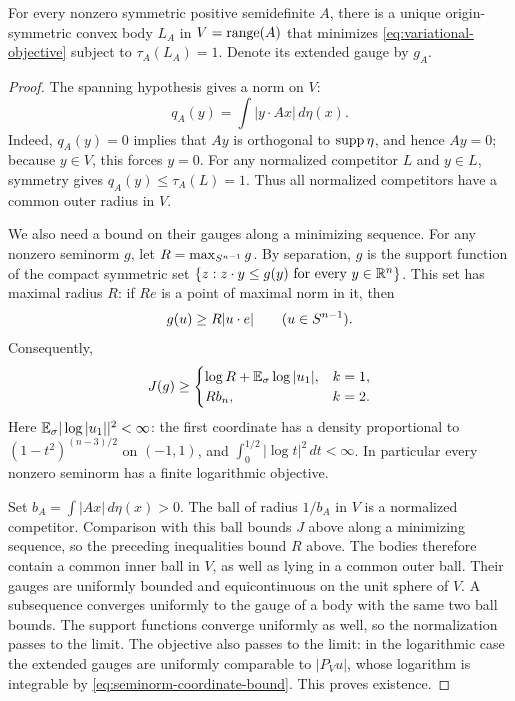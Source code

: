 \begin{lemma}\label{lem:minimizer}
For every nonzero symmetric positive semidefinite $A$, there is a unique
origin-symmetric convex body $L_A$ in $V=\operatorname{range}(A)$ that minimizes
\eqref{eq:variational-objective} subject to $\tau_A(L_A)=1$.
Denote its extended gauge by $g_A$.
\end{lemma}

\begin{proof}
The spanning hypothesis gives a norm on $V$:
\[
 q_A(y)=\int |y\cdot Ax|\,d\eta(x).
\]
Indeed, $q_A(y)=0$ implies that $Ay$ is orthogonal to $\operatorname{supp}\eta$,
and hence $Ay=0$; because $y\in V$, this forces $y=0$.
For any normalized competitor $L$ and $y\in L$, symmetry gives
$q_A(y)\le\tau_A(L)=1$. Thus all normalized competitors have a common
outer radius in $V$.

We also need a bound on their gauges along a minimizing sequence.
For any nonzero seminorm $g$, let $R=\max_{S^{n-1}}g$. By separation,
$g$ is the support function of the compact symmetric set
$\{z:z\cdot y\le g(y)\text{ for every }y\in\mathbb R^n\}$.
This set has maximal radius $R$: if $Re$ is a point of maximal norm
in it, then
\begin{equation}\label{eq:seminorm-coordinate-bound}
 g(u)\ge R|u\cdot e|\qquad(u\in S^{n-1}).
\end{equation}
Consequently,
\[
 J(g)\ge
 \begin{cases}
  \log R+\mathbb E_{\sigma}\log|u_1|,&k=1,\\
  Rb_n,&k=2.
 \end{cases}
\]
Here $\mathbb E_{\sigma}|\log|u_1||^2<\infty$: the first coordinate has a density
proportional to $(1-t^2)^{(n-3)/2}$ on $(-1,1)$, and
$\int_0^{1/2}|\log t|^2\,dt<\infty$. In particular every nonzero
seminorm has a finite logarithmic objective.

Set $b_A=\int|Ax|\,d\eta(x)>0$. The ball of radius $1/b_A$ in $V$
is a normalized competitor. Comparison with this ball bounds $J$
above along a minimizing sequence, so the preceding inequalities bound
$R$ above. The bodies therefore contain a common inner ball in $V$,
as well as lying in a common outer ball. Their gauges are uniformly
bounded and equicontinuous on the unit sphere of $V$. A subsequence
converges uniformly to the gauge of a body with the same two ball
bounds. The support functions converge uniformly as well, so the
normalization passes to the limit. The objective also passes to the
limit: in the logarithmic case the extended gauges are uniformly
comparable to $|P_Vu|$, whose logarithm is integrable by
\eqref{eq:seminorm-coordinate-bound}. This proves existence.


\end{proof}
